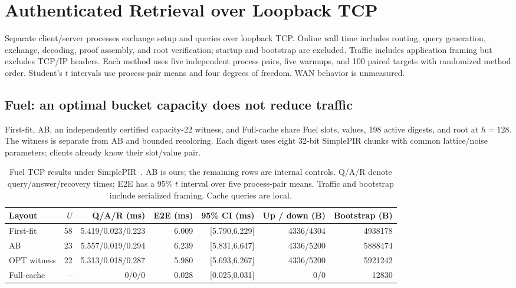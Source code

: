 \section{Authenticated Retrieval over Loopback TCP}
\label{sec:layout-transfer}

Separate client/server processes exchange setup and queries over loopback TCP. Online wall time includes routing, query generation, exchange, decoding, proof assembly, and root verification; startup and bootstrap are excluded. Traffic includes application framing but excludes TCP/IP headers. Each method uses five independent process pairs, five warmups, and 100 paired targets with randomized method order. Student's $t$ intervals use process-pair means and four degrees of freedom. WAN behavior is unmeasured.

\subsection{Fuel: an optimal bucket capacity does not reduce traffic}
\label{sec:fuel-layout-transfer}

First-fit, AB, an independently certified capacity-22 witness, and Full-cache share Fuel slots, values, 198 active digests, and root at $h=128$. The witness is separate from AB and bounded recoloring. Each digest uses eight 32-bit SimplePIR chunks with common lattice/noise parameters; clients already know their slot/value pair.

\begin{table}[t]
\centering\small\setlength{\tabcolsep}{5pt}
\caption{Fuel TCP results under SimplePIR~\cite{simplepir}. AB is ours; the remaining rows are internal controls. Q/A/R denote query/answer/recovery times; E2E has a 95\% $t$ interval over five process-pair means. Traffic and bootstrap include serialized framing. Cache queries are local.}
\label{tab:fuel-layout-transfer}
\begin{tabular}{lrrrrrr}
\toprule
Layout & $U$ & Q/A/R (ms) & E2E (ms) & 95\% CI (ms) & Up / down (B) & Bootstrap (B)\\
\midrule
First-fit & 58 & 5.419/0.023/0.223 & 6.009 & [5.790,6.229] & 4336/4304 & 4938178\\
AB & 23 & 5.557/0.019/0.294 & 6.239 & [5.831,6.647] & 4336/5200 & 5888474\\
OPT witness & 22 & 5.313/0.018/0.287 & 5.980 & [5.693,6.267] & 4336/5200 & 5921242\\
Full-cache & -- & 0/0/0 & 0.028 & [0.025,0.031] & 0/0 & 12830\\
\bottomrule
\end{tabular}
\end{table}


